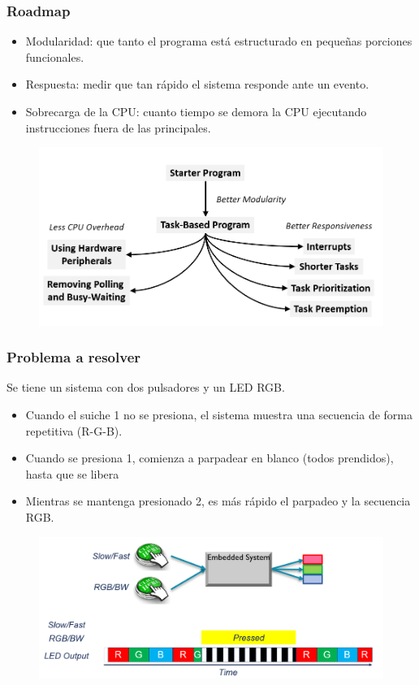 \documentclass[10.5pt,scale=1.0,t,aspectratio=169,hyperref={pdfpagelabels=false}]{beamer}
\begin{document}
\begin{frame}
	\frametitle{Roadmap}
	\begin{itemize}
		\item Modularidad: que tanto el programa está estructurado en pequeñas porciones funcionales.
		\item Respuesta: medir que tan rápido el sistema responde ante un evento.
		\item Sobrecarga de la CPU: cuanto tiempo se demora la CPU ejecutando instrucciones fuera de las principales. 
	\end{itemize}	
	\begin{figure}
		\centering
		\includegraphics[scale=0.35]{01_SchedullingRoadmap}
	\end{figure}
\end{frame}

\begin{frame}
	\frametitle{Problema a resolver}
	Se tiene un sistema con dos pulsadores y un LED RGB. 
	\begin{itemize}
		\item Cuando el suiche 1 no se presiona, el sistema muestra una secuencia de forma repetitiva (R-G-B).
		\item Cuando se presiona 1, comienza a parpadear en blanco (todos prendidos), hasta que se libera
		\item Mientras se mantenga presionado 2, es más rápido el parpadeo y la secuencia RGB.
	\end{itemize}
	\begin{figure}
		\centering
		\includegraphics[scale=0.35]{02_ParpadeoEjemplo}
	\end{figure}
\end{frame}
\end{document}
